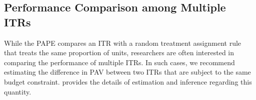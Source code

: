 \documentclass[USenglish,onecolumn]{article}
\DeclareMathOperator\Cov{Cov}
\renewcommand\r{\right}
\renewcommand\l{\left}
\newcommand\bX{\bm{X}}
\begin{document}

\subsection{Performance Comparison among Multiple ITRs}
\label{subsec:multiple}

While the PAPE compares an ITR with a random treatment assignment rule
that treats the same proportion of units, researchers are often
interested in comparing the performance of multiple ITRs.  In such
cases, we recommend estimating the difference in PAV between two ITRs
that are subject to the same budget constraint.
\citep{imai2021experimental} provides the details of estimation and
inference regarding this quantity.
\end{document}
